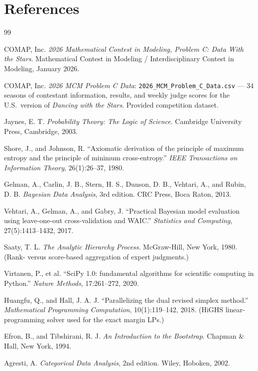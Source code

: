 \documentclass[11pt]{article}
\begin{document}
\section*{References}
\begin{thebibliography}{99}

 COMAP, Inc. \emph{2026 Mathematical Contest in Modeling, Problem C:
Data With the Stars}. Mathematical Contest in Modeling / Interdisciplinary Contest in
Modeling, January 2026.

 COMAP, Inc. \emph{2026 MCM Problem C Data}:
\texttt{2026\_MCM\_Problem\_C\_Data.csv} --- 34 seasons of contestant information,
results, and weekly judge scores for the U.S.\ version of \textit{Dancing with the
Stars}. Provided competition dataset.

 Jaynes, E. T. \emph{Probability Theory: The Logic of Science}.
Cambridge University Press, Cambridge, 2003.

 Shore, J., and Johnson, R. ``Axiomatic derivation of the principle
of maximum entropy and the principle of minimum cross-entropy.'' \emph{IEEE
Transactions on Information Theory}, 26(1):26--37, 1980.

 Gelman, A., Carlin, J. B., Stern, H. S., Dunson, D. B., Vehtari,
A., and Rubin, D. B. \emph{Bayesian Data Analysis}, 3rd edition. CRC Press, Boca Raton,
2013.

 Vehtari, A., Gelman, A., and Gabry, J. ``Practical Bayesian model
evaluation using leave-one-out cross-validation and WAIC.'' \emph{Statistics and
Computing}, 27(5):1413--1432, 2017.

 Saaty, T. L. \emph{The Analytic Hierarchy Process}. McGraw-Hill,
New York, 1980. (Rank- versus score-based aggregation of expert judgments.)

 Virtanen, P., et al. ``SciPy 1.0: fundamental algorithms for
scientific computing in Python.'' \emph{Nature Methods}, 17:261--272, 2020.

 Huangfu, Q., and Hall, J. A. J. ``Parallelizing the dual revised
simplex method.'' \emph{Mathematical Programming Computation}, 10(1):119--142, 2018.
(HiGHS linear-programming solver used for the exact margin LPs.)

 Efron, B., and Tibshirani, R. J. \emph{An Introduction to the
Bootstrap}. Chapman \& Hall, New York, 1994.

 Agresti, A. \emph{Categorical Data Analysis}, 2nd edition. Wiley,
Hoboken, 2002.

\end{thebibliography}
\end{document}
